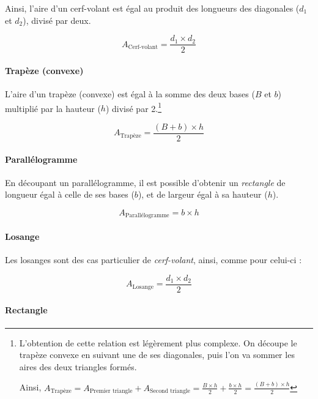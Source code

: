 \documentclass[a4paper, twoside]{article}
\begin{document}
Ainsi, l'aire d'un cerf-volant est égal au produit des longueurs
des diagonales ($d_{1}$ et $d_{2}$), divisé par deux.

$$A_{\text{Cerf-volant}} = \frac{ d_{1} \times d_{2} }{ 2 }$$

\vspace*{-0.25cm}

\paragraph*{Trapèze (convexe)}

L'aire d'un trapèze (convexe) est égal à la somme des
deux bases ($B$ et $b$) multiplié par la hauteur ($h$) divisé par 2.\footnote{
	L'obtention de cette relation est légèrement plus complexe.
	On découpe le trapèze convexe en suivant une de ses diagonales,
	puis l'on va sommer les aires des deux triangles formés.

	Ainsi, $A_{\text{Trapèze}} = A_{\text{Premier triangle}} + A_{\text{Second triangle}} = \frac{B \times h}{2} + \frac{b \times h}{2} = \frac {(B+b) \times h}{2}$
}

$$A_{\text{Trapèze}} = \frac {(B+b) \times h}{2}$$

\vspace*{-0.25cm}

\paragraph*{Parallélogramme}

En découpant un parallélogramme,
il est possible d'obtenir un \textit{rectangle} de longueur égal à celle de ses bases ($b$),
et de largeur égal à sa hauteur ($h$).

$$A_{\text{Parallélogramme}} = b \times h$$

\vspace*{-0.25cm}

\paragraph*{Losange}

Les losanges sont des cas particulier de \textit{cerf-volant},
ainsi, comme pour celui-ci :

$$A_{\text{Losange}} = \frac{ d_{1} \times d_{2} }{ 2 }$$

\vspace*{-0.25cm}

\paragraph*{Rectangle}
\end{document}
